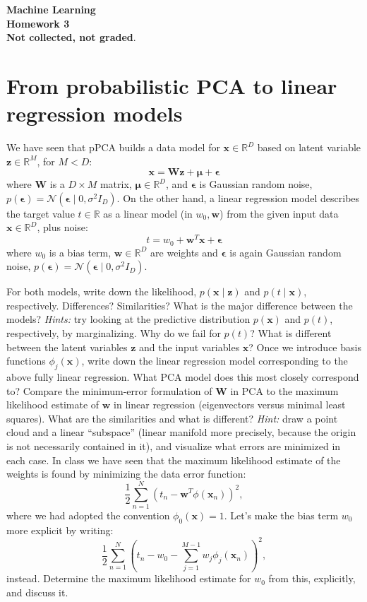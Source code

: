 \documentclass[11pt,noanswers,addpoints]{exam}
\renewcommand{\boldsymbol}[1]{\pmb{#1}}
\newcommand{\R}{\mathbb R}
\newcommand{\W}{\mathbf W}
\newcommand{\x}{\mathbf x}
\newcommand{\w}{\mathbf w}
\newcommand{\z}{\mathbf z}
\newcommand{\N}{\mathcal N}
\begin{document}
{\Large{\textbf{Machine Learning}}} \\[2mm]
\textbf{\Huge{Homework 3}}\\[2mm]


\textbf{Not collected, not graded}.


\section{From probabilistic PCA to linear regression models}
We have seen that pPCA builds a data model for $\x \in \R^D$ based on latent variable $\z \in \R^M$, for $M<D$:
$$\x = \W\z + \boldsymbol\mu + \boldsymbol\epsilon$$
where $\W$ is  a $D\times M$ matrix, $\boldsymbol\mu\in\R^D$, and $\boldsymbol\epsilon$ is Gaussian random noise, $p(\boldsymbol\epsilon)=\N(\boldsymbol\epsilon\mid 0,\sigma^2I_D)$.
On the other hand, a linear regression model describes the target value $t \in \R$ as a linear model (in $w_0,\w$) from the given input data $\x\in\R^D$, plus noise:
$$t = w_0 + \w^T\x + \boldsymbol\epsilon$$
where $w_0$ is a bias term, $\w\in\R^D$ are weights and $\boldsymbol\epsilon$ is again Gaussian random noise, $p(\boldsymbol\epsilon)=\N(\boldsymbol\epsilon\mid 0,\sigma^2I_D)$.
\begin{questions}
\question For both models, write down the likelihood, $p(\x\mid \z)$ and $p(t\mid\x)$, respectively. Differences? Similarities?
\question What is the major difference between the models? \emph{Hints:} try looking at the predictive distribution $p(\x)$ and $p(t)$, respectively, by marginalizing. Why do we fail for $p(t)$? What is different between the latent variables $\z$ and the input variables $\x$?
\question Once we introduce basis functions $\phi_j(\x)$, write down the linear regression model corresponding to the above fully linear regression. What PCA model does this most closely correspond to?
\question Compare the minimum-error formulation of $\W$ in PCA to the maximum likelihood estimate of $\w$ in linear regression (eigenvectors versus minimal least squares). What are the similarities and what is different? \emph{Hint:} draw a point cloud and a linear ``subspace'' (linear manifold more precisely, because the origin is not necessarily contained in it), and visualize what errors are minimized in each case.
\question In class we have seen that the maximum likelihood estimate of the weights is found by minimizing the data error function:
$$\frac{1}{2}\sum_{n=1}^N \left(t_n - \w^T\phi(\x_n)\right)^2,$$
where we had adopted the convention $\phi_0(\x) = 1$. Let's make the bias term $w_0$ more explicit by writing:
$$\frac{1}{2}\sum_{n=1}^N \left(t_n - w_0 - \sum_{j=1}^{M-1}w_j\phi_j(\x_n)\right)^2,$$
instead. Determine the maximum likelihood estimate for $w_0$ from this, explicitly, and discuss it.
\end{questions}
\end{document}
